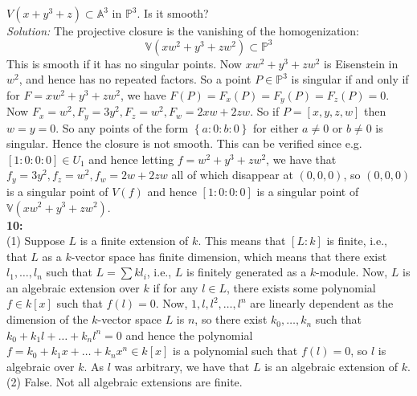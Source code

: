 \documentclass[a4paper]{article}
\begin{document}
      $V(x+y^3 + z) \subset \mathbb{A}^3$ in $\mathbb{P}^3$. Is it smooth?\\
      \linebreak
      \textit{Solution:} The projective closure is the vanishing of the
      homogenization:
      \[
      \mathbb{V} \left( xw^2 + y^3 + zw^2 \right) \subset \mathbb{P}^3
      \] 
      This is smooth if it has no singular points. Now
      $x w^2 + y^3 + z w^2$ is Eisenstein in $w^2$, and hence has no repeated
      factors. So a point $P\in \mathbb{P}^3$ is singular if and only if
      for  $F = xw^2 + y^3 + zw^2$, we have
      $F(P) = F_x(P) = F_y(P) = F_z(P) = 0$. Now
      $F_x = w^2, F_y = 3y^2, F_z = w^2, F_w = 2xw + 2zw$. So
      if  $P = \left[ x,y,z,w \right] $ then
      $w = y = 0$. So
      any points of the form $\left\{ a : 0 : b : 0 \right\} $ for either
      $a\neq 0$ or $b \neq 0$ is singular. Hence the closure is not smooth.
      This can be verified since e.g. $\left[ 1 : 0 : 0 : 0 \right] 
      \in U_1$ and hence letting $f = w^2 + y^3 + z w^2$, we have that
      $f_y = 3y^2, f_z = w^2, f_w = 2w + 2zw$ all of which disappear at
      $(0,0,0)$, so
      $(0,0,0)$ is a singular point of $V(f)$ and hence
      $\left[ 1 : 0 : 0 : 0 \right] $ is a singular point of
      $\mathbb{V}\left( xw^2 + y^3 + zw^2 \right) $.\\
      \linebreak
      \textbf{10:}\\
      (1) Suppose $L$ is a finite extension of $k$. This means that
      $\left[ L : k \right] $ is finite, i.e., that
      $L$ as a $k$-vector space has finite dimension, which means that there
      exist $l_1, \ldots, l_n$ such that
      $L = \sum k l_i$, i.e., $L$ is finitely generated as a $k$-module. Now,
      $L$ is an algebraic extension over $k$ if for any $l \in L$, there
      exists some polynomial $f \in k\left[ x \right] $ such that
      $f(l) = 0$. Now,  $1, l, l^2, \ldots, l^{n}$ are linearly dependent as
      the dimension of the $k$-vector space $L$ is $n$, so there exist
      $k_0, \ldots, k_n$ such that
      $k_0 + k_1 l + \ldots + k_n l^{n} = 0$ and hence
      the polynomial $f = k_0 + k_1 x+ \ldots + k_n x^{n} \in k\left[ x \right]
      $ is a polynomial such that $f(l)=0$, so $l$ is algebraic over
      $k$. As $l$ was arbitrary, we have that $L$ is an algebraic extension of
      $k$.\\
      \linebreak
      (2) False. Not all algebraic extensions are finite.\\
\end{document}
